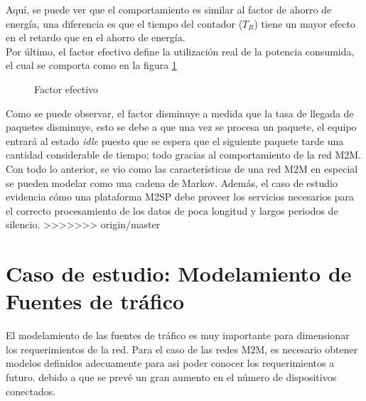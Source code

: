 \documentclass[journal]{IEEEtran}
\begin{document}
Aquí, se puede ver que el comportamiento es similar al factor de ahorro de energía, una diferencia es que el tiempo del contador ($T_{R}$) tiene un mayor efecto en el retardo que en el ahorro de energía.\\

Por último, el factor efectivo define la utilización real de la potencia consumida, el cual se comporta como en la figura \ref{efectivo}

\begin{figure}[h]
\centering
{}
\caption{Factor efectivo}
\label{efectivo}
\end{figure}

Como se puede observar, el factor disminuye a medida que la tasa de llegada de paquetes disminuye, esto se debe a que una vez se procesa un paquete, el equipo entrará al estado \textit{idle} puesto que se espera que el siguiente paquete tarde una cantidad considerable de tiempo; todo gracias al comportamiento de la red M2M.\\

Con todo lo anterior, se vio como las características de una red M2M en especial se pueden modelar como una cadena de Markov. Además, el caso de estudio evidencia cómo una plataforma M2SP debe proveer los servicios necesarios para el correcto procesamiento de los datos de poca longitud y largos periodos de silencio.
>>>>>>> origin/master

\section{Caso de estudio: Modelamiento de Fuentes de tráfico}
El modelamiento de las fuentes de tráfico es muy importante para dimensionar los requerimientos de la red. Para el caso de las redes M2M, es necesario obtener modelos definidos adecuamente para asi poder conocer los requerimientos a futuro. debido a que se prevé un gran aumento en el número de dispositivos conectados.\\
\end{document}
